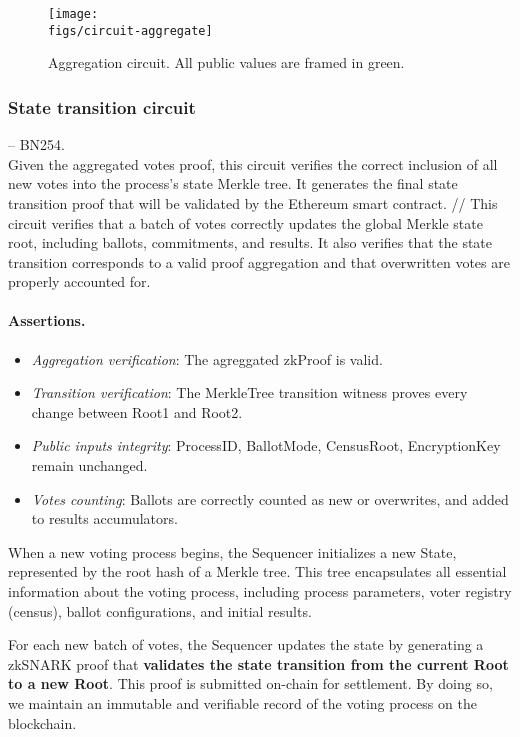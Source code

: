 \begin{figure}[h]
	\centerline{\texttt{[image: \\figs/circuit-aggregate]}}
	\caption{Aggregation circuit. All public values are framed in green.}
	\label{fig:circuit-aggregate}
\end{figure}

\newpage
\subsubsection{State transition circuit} -- BN254. \\

\noi Given the aggregated votes proof, this circuit verifies the correct inclusion of all new votes into the process's state Merkle tree. It generates the final state transition proof that will be validated by the Ethereum smart contract. // This circuit verifies that a batch of votes correctly updates the global Merkle state root, including ballots, commitments, and results. It also verifies that the state transition corresponds to a valid proof aggregation and that overwritten votes are properly accounted for.

\paragraph{Assertions.}

\begin{itemize}
	\item \emph{Aggregation verification}: The agreggated zkProof is valid.
	\item \emph{Transition verification}: The MerkleTree transition witness proves every change between Root1 and Root2.
	\item \emph{Public inputs integrity}: ProcessID, BallotMode, CensusRoot, EncryptionKey remain unchanged.
	\item \emph{Votes counting}: Ballots are correctly counted as new or overwrites, and added to results accumulators.
\end{itemize}

When a new voting process begins, the Sequencer initializes a new State, represented by the root hash of a Merkle tree. This tree encapsulates all essential information about the voting process, including process parameters, voter registry (census), ballot configurations, and initial results.

For each new batch of votes, the Sequencer updates the state by generating a zkSNARK proof that \textbf{validates the state transition from the current Root to a new Root}. This proof is submitted on-chain for settlement. By doing so, we maintain an immutable and verifiable record of the voting process on the blockchain.

